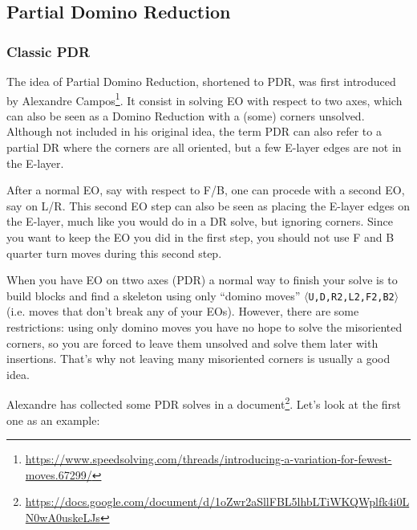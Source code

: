 \documentclass[11pt,a4paper]{book}
\newcommand{\m}{\texttt}
\begin{document}
\subsection{Partial Domino Reduction}
\label{sec:PDR}

\subsubsection{Classic PDR}

The idea of Partial Domino Reduction, shortened to PDR, was first introduced by Alexandre Campos\footnote{\url{https://www.speedsolving.com/threads/introducing-a-variation-for-fewest-moves.67299/}}. It consist in solving EO with respect to two axes, which can also be seen as a Domino Reduction with a (some) corners unsolved. Although not included in his original idea, the term PDR can also refer to a partial DR where the corners are all oriented, but a few E-layer edges are not in the E-layer.

After a normal EO, say with respect to F/B, one can procede with a second EO, say on L/R. This second EO step can also be seen as placing the E-layer edges on the E-layer, much like you would do in a DR solve, but ignoring corners. Since you want to keep the EO you did in the first step, you should not use F and B quarter turn moves during this second step.

When you have EO on ttwo axes (PDR) a normal way to finish your solve is to build blocks and find a skeleton using only ``domino moves'' $\langle$\m{U,D,R2,L2,F2,B2}$\rangle$ (i.e. moves that don't break any of your EOs). However, there are some restrictions: using only domino moves you have no hope to solve the misoriented corners, so you are forced to leave them unsolved and solve them later with insertions. That's why not leaving many misoriented corners is usually a good idea.

Alexandre has collected some PDR solves in a document\footnote{\url{https://docs.google.com/document/d/1oZwr2aSllFBL5lhbLTiWKQWplfk4i0LN0wA0uskeLJs}}. Let's look at the first one as an example:
\end{document}
